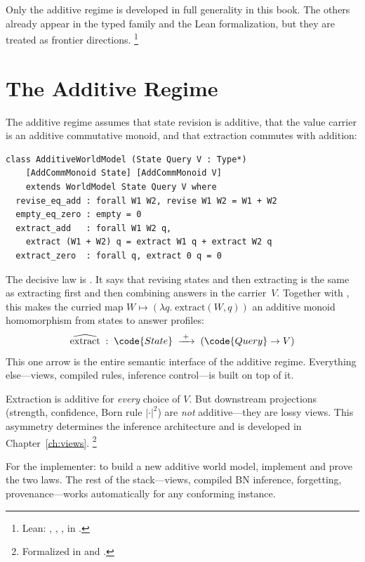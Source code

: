 \documentclass[11pt,openany]{report}
\begin{document}
\noindent
Only the additive regime is developed in full generality in this book.
The others already appear in the typed family and the Lean
formalization, but they are treated as frontier directions.%
\footnote{Lean: , ,
,  in
.}


\section{The Additive Regime}
\label{sec:additive-regime}

The additive regime assumes that state revision is additive, that the
value carrier is an additive commutative monoid, and that extraction
commutes with addition:

\begin{lstlisting}[language={}]
class AdditiveWorldModel (State Query V : Type*)
    [AddCommMonoid State] [AddCommMonoid V]
    extends WorldModel State Query V where
  revise_eq_add : forall W1 W2, revise W1 W2 = W1 + W2
  empty_eq_zero : empty = 0
  extract_add   : forall W1 W2 q,
    extract (W1 + W2) q = extract W1 q + extract W2 q
  extract_zero  : forall q, extract 0 q = 0
\end{lstlisting}

\noindent
The decisive law is .  It says that revising states
and then extracting is the same as extracting first and then combining
answers in the carrier~$V$.  Together with , this
makes the curried map
$W \mapsto (\lambda q.\; \mathrm{extract}(W, q))$ an additive monoid
homomorphism from states to answer profiles:
\[
  \widehat{\mathrm{extract}} \;:\;
  \code{State} \;\xrightarrow{\;+\;}\;
  (\code{Query} \to V)
\]
This one arrow is the entire semantic interface of the additive regime.
Everything else---views, compiled rules, inference control---is built
on top of it.

Extraction is additive for \emph{every} choice of $V$.  But downstream
projections (strength, confidence, Born rule $|\cdot|^2$) are
\emph{not} additive---they are lossy views.  This asymmetry determines
the inference architecture and is developed in
Chapter~\ref{ch:views}.%
\footnote{Formalized in
and .}

For the implementer: to build a new additive world model, implement
 and prove the two laws.  The rest of the stack---views,
compiled BN inference, forgetting, provenance---works automatically for
any conforming instance.
\end{document}
